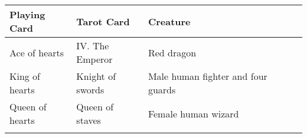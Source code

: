 \begin{longtable}{llllll}
\hline
\multicolumn{1}{|p{1.102in}|}{\begin{minipage}[t]{1.102in}\raggedright
\textbf{Playing Card}\end{minipage}} & \multicolumn{1}{p{1.207in}|}{\begin{minipage}[t]{1.207in}\raggedright
\textbf{Tarot Card}\end{minipage}} & \multicolumn{1}{p{2.016in}|}{\begin{minipage}[t]{2.016in}\raggedright
\textbf{Creature}\end{minipage}}\\
\hline
\multicolumn{1}{p{0.059in}|}{\begin{minipage}[t]{0.059in}\raggedright
Ace of hearts\end{minipage}} & \multicolumn{1}{p{0.059in}|}{\begin{minipage}[t]{0.059in}\raggedright
IV. The Emperor\end{minipage}} & \multicolumn{1}{p{0.059in}|}{\begin{minipage}[t]{0.059in}\raggedright
Red dragon\end{minipage}}\\
\hline
\multicolumn{1}{|p{1.102in}|}{\begin{minipage}[t]{1.102in}\raggedright
King of hearts\end{minipage}} & \multicolumn{1}{p{1.207in}|}{\begin{minipage}[t]{1.207in}\raggedright
Knight of swords\end{minipage}} & \multicolumn{1}{p{2.016in}|}{\begin{minipage}[t]{2.016in}\raggedright
Male human fighter and four guards\end{minipage}}\\
\hline
\multicolumn{1}{p{0.059in}|}{\begin{minipage}[t]{0.059in}\raggedright
Queen of hearts\end{minipage}} & \multicolumn{1}{p{0.059in}|}{\begin{minipage}[t]{0.059in}\raggedright
Queen of staves\end{minipage}} & \multicolumn{1}{p{0.059in}|}{\begin{minipage}[t]{0.059in}\raggedright
Female human wizard\end{minipage}}\\
\hline
\multicolumn{1}{|p{1.102in}|}{\begin{minipage}[t]{1.102in}\raggedright

\end{minipage}}
\end{longtable}
